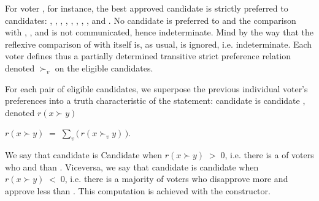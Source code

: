 \documentclass[a4paper,12pt,english]{sphinxhowto}
\begin{document}
\sphinxAtStartPar
For voter , for instance, the best approved candidate  is strictly preferred to candidates: , , , , , , , ,  and . No candidate is preferred to  and the comparison with , ,  and  is not communicated, hence indeterminate. Mind by the way that the reflexive comparison of  with itself is, as usual, is ignored, i.e. indeterminate. Each voter  defines thus a partially determined transitive strict preference relation denoted \(\succ_v\) on the eligible candidates.

\sphinxAtStartPar
For each pair of eligible candidates, we superpose the previous individual voter’s preferences into a truth characteristic of the statement: candidate  is  candidate , denoted \(r(x \succ y)\)

\sphinxAtStartPar
\(r(x \succ y)\;=\; \sum_v \big(\,r(x \succ_v y)\, \big)\).

\sphinxAtStartPar
We say that candidate  is  Candidate  when \(r(x \succ y)\;>\;0\), i.e. there is a  of voters who   and    than . Vice\sphinxhyphen{}versa, we say that candidate  is  candidate  when \(r(x \succ y)\;<\;0\), i.e. there is a majority of voters who disapprove more and approve less  than . This computation is achieved with the  constructor.
\end{document}
